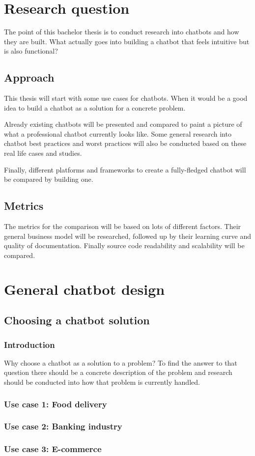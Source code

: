 \chapter{Research question}

The point of this bachelor thesis is to conduct research into chatbots and how they are built. What actually goes into building a chatbot that feels intuitive but is also functional?

\section{Approach}

This thesis will start with some use cases for chatbots. When it would be a good idea to build a chatbot as a solution for a concrete problem.

Already existing chatbots will be presented and compared to paint a picture of what a professional chatbot currently looks like.
Some general research into chatbot best practices and worst practices will also be conducted based on these real life cases and studies.

Finally, different platforms and frameworks to create a fully-fledged chatbot will be compared by building one.

\section{Metrics}

The metrics for the comparison will be based on lots of different factors. Their general business model will be researched, followed up by their learning curve and quality of documentation. Finally source code readability and scalability will be compared.

\chapter{General chatbot design}

\section{Choosing a chatbot solution}

\subsection{Introduction}

Why choose a chatbot as a solution to a problem? To find the answer to that question there should be a concrete description of the problem and research should be conducted into how that problem is currently handled.

\subsection{Use case 1: Food delivery}

\subsection{Use case 2: Banking industry}

\subsection{Use case 3: E-commerce}
